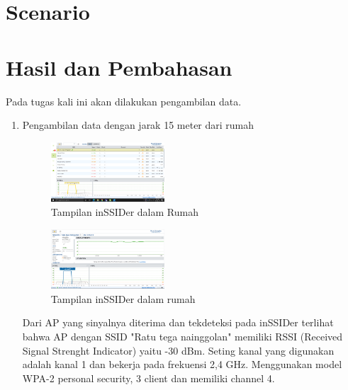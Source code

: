 \documentclass[conference]{IEEEtran}
\begin{document}
\section{Scenario}

\begin{figure}[htbp]
    
\end{figure}

\section{Hasil dan Pembahasan}
\vspace{0.2cm}

Pada tugas kali ini akan dilakukan pengambilan data.
\begin{enumerate}
    \item Pengambilan data dengan jarak 15 meter dari rumah

    \begin{figure}
        \centering
        \includegraphics[width=0.4\textwidth]{8.png}
        \caption{Tampilan inSSIDer dalam Rumah}
    \end{figure}

    \begin{figure}
        \centering
        \includegraphics[width=0.4\textwidth]{9.png}
        \caption{Tampilan inSSIDer dalam rumah}
    \end{figure}

\vspace{0.2cm}

Dari AP yang sinyalnya diterima dan tekdeteksi pada inSSIDer terlihat bahwa AP dengan SSID 
"Ratu tega nainggolan" memiliki RSSI (Received Signal Strenght Indicator) yaitu -30 dBm. 
Seting kanal yang digunakan adalah kanal 1 dan bekerja pada frekuensi 2,4 GHz. 
Menggunakan model WPA-2 personal security, 3 client dan memiliki channel 4.
\vspace{0.2cm}


\end{enumerate}
\end{document}
